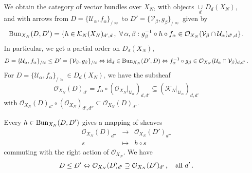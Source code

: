 \documentclass[leqno]{article}
\numberwithin{equation}{section}
\begin{document}
\bigskip

We obtain the category of vector bundles over $X_N$, with objects $\underset{d}{\cup} \, D_d (X_N)$, and with arrows from $D = \{{\mathcal U}_{\alpha} , f_{\alpha} \}_{/\approx}$ to $D' = \{{\mathcal V}_{\beta} , g_{\beta} \}_{/\approx}$ given by
\begin{equation}
\setcounter{equation}{5}
\label{eq115}
{\rm Bun}_{X_N} (D,D') = \{ h \in {\mathcal K}_N (X_N)_{d',d} \, , \ \forall \, \alpha , \beta : g_{\beta}^{-1} \circ h \circ f_{\alpha} \in {\mathcal O}_{X_N} ({\mathcal V}_{\beta} \cap {\mathcal U}_{\alpha})_{d',d} \} \, .
\end{equation}
In particular, we get a partial order on $D_d (X_N)$,
\begin{equation}
\label{eq116}
D = \{ {\mathcal U}_{\alpha} , f_{\alpha} \}_{/\approx} \leq D' = \{ {\mathcal V}_{\beta} , g_{\beta}\}_{/\approx} \Leftrightarrow {\rm id}_d \in {\rm Bun}_{X_N} (D',D) \Leftrightarrow f_{\alpha}^{-1} \circ g_{\beta} \in {\mathcal O}_{X_N} ({\mathcal U}_{\alpha} \cap {\mathcal V}_{\beta})_{d,d'} \, .
\end{equation}
For $D = \{ {\mathcal U}_{\alpha} , f_{\alpha} \}_{/\approx} \in D_d (X_N)$, we have the subsheaf
\begin{equation}
\label{eq117}
{\mathcal O}_{X_N} (D)_{d'} = f_{\alpha} \circ ({\mathcal O}_{X_N} \vert_{{\mathcal U}_{\alpha}})_{d,d'} \subseteq ({\mathcal K}_N \vert_{{\mathcal U}_{\alpha}})_{d,d'}
\end{equation}
with ${\mathcal O}_{X_N} (D)_{d'} \circ ({\mathcal O}_{X_N})_{d',d''} \subseteq {\mathcal O}_{X_N} (D)_{d''}$.

\smallskip

Every $h \in {\rm Bun}_{X_N} (D,D')$ gives a mapping of sheaves
\begin{eqnarray}
\label{eq118}
{\mathcal O}_{X_N} (D)_{d''} &\to &{\mathcal O}_{X_N} (D')_{d''}  \\
s &\mapsto &h \circ s \nonumber
\end{eqnarray}
commuting with the right action of ${\mathcal O}_{X_N}$. We have
\begin{equation}
\label{eq119}
D \leq D' \Leftrightarrow {\mathcal O}_{X_N} (D)_{d'} \supseteq {\mathcal O}_{X_N} (D')_{d'} \, , \quad {\rm all} \ d' \, .
\end{equation}
\end{document}
